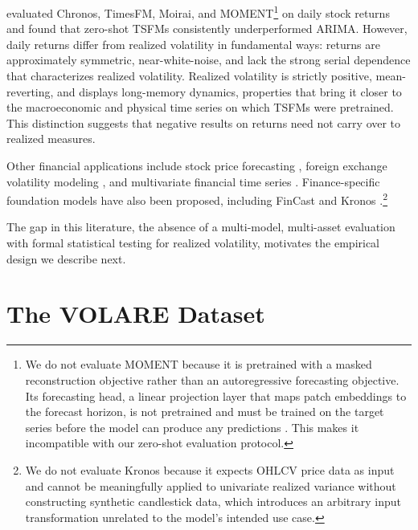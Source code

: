\documentclass[12pt]{article}
\begin{document}
\citet{rahimikia2025revisiting} evaluated Chronos, TimesFM, Moirai, and MOMENT\footnote{We do not evaluate MOMENT because it is pretrained with a masked reconstruction objective rather than an autoregressive forecasting objective. Its forecasting head, a linear projection layer that maps patch embeddings to the forecast horizon, is not pretrained and must be trained on the target series before the model can produce any predictions \citep[Sections~3.3--3.4]{goswami2024moment}. This makes it incompatible with our zero-shot evaluation protocol.} on daily stock returns and found that zero-shot TSFMs consistently underperformed ARIMA. However, daily returns differ from realized volatility in fundamental ways: returns are approximately symmetric, near-white-noise, and lack the strong serial dependence that characterizes realized volatility. Realized volatility is strictly positive, mean-reverting, and displays long-memory dynamics, properties that bring it closer to the macroeconomic and physical time series on which TSFMs were pretrained. This distinction suggests that negative results on returns need not carry over to realized measures.

Other financial applications include stock price forecasting \citep{laniewski2025chronos, valeyre2024chronosstocks}, foreign exchange volatility modeling \citep{nguyen2025volabert}, and multivariate financial time series \citep{marconi2025}. Finance-specific foundation models have also been proposed, including FinCast \citep{zhu2025fincast} and Kronos \citep{shi2025kronos}.\footnote{We do not evaluate Kronos because it expects OHLCV price data as input and cannot be meaningfully applied to univariate realized variance without constructing synthetic candlestick data, which introduces an arbitrary input transformation unrelated to the model's intended use case.}

The gap in this literature, the absence of a multi-model, multi-asset evaluation with formal statistical testing for realized volatility, motivates the empirical design we describe next.

\section{The VOLARE Dataset}
\label{sec:data}

\end{document}

